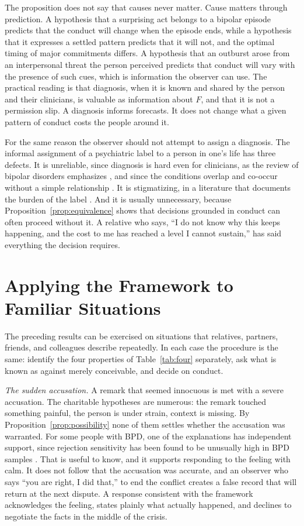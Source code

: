 \documentclass[11pt]{article}
\theoremstyle{definition}
\theoremstyle{remark}
\begin{document}
The proposition does not say that causes never matter. Cause matters through prediction. A hypothesis that a surprising act belongs to a bipolar episode predicts that the conduct will change when the episode ends, while a hypothesis that it expresses a settled pattern predicts that it will not, and the optimal timing of major commitments differs. A hypothesis that an outburst arose from an interpersonal threat the person perceived predicts that conduct will vary with the presence of such cues, which is information the observer can use. The practical reading is that diagnosis, when it is known and shared by the person and their clinicians, is valuable as information about $F$, and that it is not a permission slip. A diagnosis informs forecasts. It does not change what a given pattern of conduct costs the people around it.

For the same reason the observer should not attempt to assign a diagnosis. The informal assignment of a psychiatric label to a person in one's life has three defects. It is unreliable, since diagnosis is hard even for clinicians, as the review of bipolar disorders emphasizes \citep{vieta2018}, and since the conditions overlap and co-occur without a simple relationship \citep{paris2007}. It is stigmatizing, in a literature that documents the burden of the label \citep{sheehan2016}. And it is usually unnecessary, because Proposition~\ref{prop:equivalence} shows that decisions grounded in conduct can often proceed without it. A relative who says, ``I do not know why this keeps happening, and the cost to me has reached a level I cannot sustain,'' has said everything the decision requires.

\section{Applying the Framework to Familiar Situations}\label{sec:cases}

The preceding results can be exercised on situations that relatives, partners, friends, and colleagues describe repeatedly. In each case the procedure is the same: identify the four properties of Table~\ref{tab:four} separately, ask what is known as against merely conceivable, and decide on conduct.

\emph{The sudden accusation.} A remark that seemed innocuous is met with a severe accusation. The charitable hypotheses are numerous: the remark touched something painful, the person is under strain, context is missing. By Proposition~\ref{prop:possibility} none of them settles whether the accusation was warranted. For some people with BPD, one of the explanations has independent support, since rejection sensitivity has been found to be unusually high in BPD samples \citep{staebler2011}. That is useful to know, and it supports responding to the feeling with calm. It does not follow that the accusation was accurate, and an observer who says ``you are right, I did that,'' to end the conflict creates a false record that will return at the next dispute. A response consistent with the framework acknowledges the feeling, states plainly what actually happened, and declines to negotiate the facts in the middle of the crisis.
\end{document}
